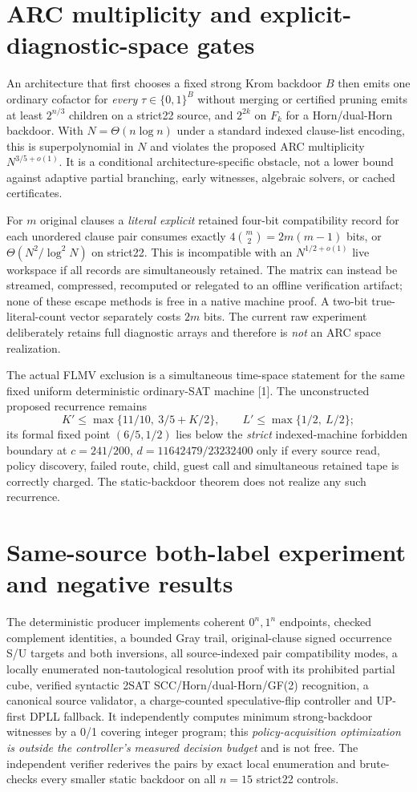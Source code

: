 \documentclass[11pt]{article}
\begin{document}
\section{ARC multiplicity and explicit-diagnostic-space gates}
An architecture that first chooses a fixed strong Krom backdoor $B$ then emits one ordinary cofactor for \emph{every} $\tau\in\{0,1\}^{B}$ without merging or certified pruning emits at least $2^{n/3}$ children on a strict22 source, and $2^{2k}$ on $F_k$ for a Horn/dual-Horn backdoor. With $N=\Theta(n\log n)$ under a standard indexed clause-list encoding, this is superpolynomial in $N$ and violates the proposed ARC multiplicity $N^{3/5+o(1)}$. It is a conditional architecture-specific obstacle, not a lower bound against adaptive partial branching, early witnesses, algebraic solvers, or cached certificates.

For $m$ original clauses a \emph{literal explicit} retained four-bit compatibility record for each unordered clause pair consumes exactly $4\binom m2=2m(m-1)$ bits, or $\Theta(N^2/\log^2N)$ on strict22. This is incompatible with an $N^{1/2+o(1)}$ live workspace if all records are simultaneously retained. The matrix can instead be streamed, compressed, recomputed or relegated to an offline verification artifact; none of these escape methods is free in a native machine proof. A two-bit true-literal-count vector separately costs $2m$ bits. The current raw experiment deliberately retains full diagnostic arrays and therefore is \emph{not} an ARC space realization.

The actual FLMV exclusion is a simultaneous time-space statement for the same fixed uniform deterministic ordinary-SAT machine [1]. The unconstructed proposed recurrence remains
\[
 K'\le\max\{11/10,\ 3/5+K/2\},\qquad
 L'\le\max\{1/2,\ L/2\};
\]
its formal fixed point $(6/5,1/2)$ lies below the \emph{strict} indexed-machine forbidden boundary at $c=241/200$, $d=11642479/23232400$ only if every source read, policy discovery, failed route, child, guest call and simultaneous retained tape is correctly charged. The static-backdoor theorem does not realize any such recurrence.

\section{Same-source both-label experiment and negative results}
The deterministic producer implements coherent $0^n,1^n$ endpoints, checked complement identities, a bounded Gray trail, original-clause signed occurrence S/U targets and both inversions, all source-indexed pair compatibility modes, a locally enumerated non-tautological resolution proof with its prohibited partial cube, verified syntactic 2SAT SCC/Horn/dual-Horn/GF(2) recognition, a canonical source validator, a charge-counted speculative-flip controller and UP-first DPLL fallback. It independently computes minimum strong-backdoor witnesses by a 0/1 covering integer program; this \emph{policy-acquisition optimization is outside the controller's measured decision budget} and is not free. The independent verifier rederives the pairs by exact local enumeration and brute-checks every smaller static backdoor on all $n=15$ strict22 controls.
\end{document}
